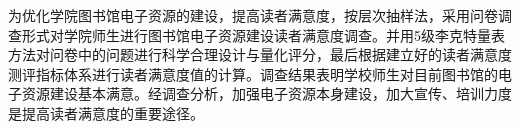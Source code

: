 \begin{chineseabstract}

    为优化学院图书馆电子资源的建设，提高读者满意度，按层次抽样法，采用问卷调查形式对学院师生进行图书馆电子资源建设读者满意度调查。并用5级李克特量表方法对问卷中的问题进行科学合理设计与量化评分，最后根据建立好的读者满意度测评指标体系进行读者满意度值的计算。调查结果表明学校师生对目前图书馆的电子资源建设基本满意。经调查分析，加强电子资源本身建设，加大宣传、培训力度是提高读者满意度的重要途径。
    
\end{chineseabstract}
